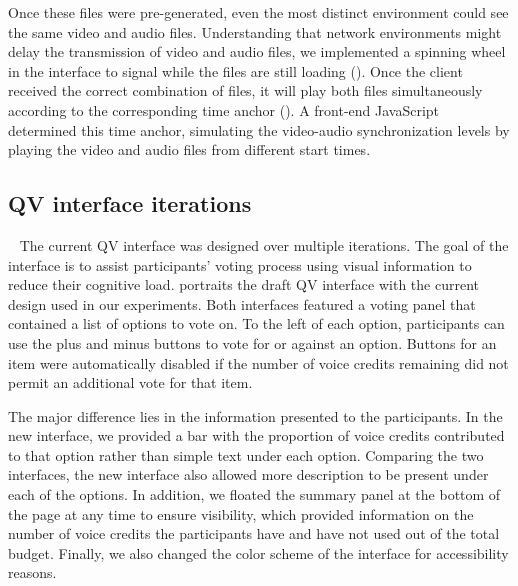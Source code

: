 Once these files were pre-generated, even the most distinct environment could see the same video and audio files. Understanding that network environments might delay the transmission of video and audio files, we implemented a spinning wheel in the interface to signal while the files are still loading (). Once the client received the correct combination of files, it will play both files simultaneously according to the corresponding time anchor (). A front-end JavaScript determined this time anchor, simulating the video-audio synchronization levels by playing the video and audio files from different start times. 

\subsection{QV interface iterations}~\label{appx_qv_interface}
The current QV interface was designed over multiple iterations. The goal of the interface is to assist participants' voting process using visual information to reduce their cognitive load.  portraits the draft QV interface with the current design used in our experiments. Both interfaces featured a voting panel that contained a list of options to vote on. To the left of each option, participants can use the plus and minus buttons to vote for or against an option. Buttons for an item were automatically disabled if the number of voice credits remaining did not permit an additional vote for that item. 

The major difference lies in the information presented to the participants. In the new interface, we provided a bar with the proportion of voice credits contributed to that option rather than simple text under each option. Comparing the two interfaces, the new interface also allowed more description to be present under each of the options. In addition, we floated the summary panel at the bottom of the page at any time to ensure visibility, which provided information on the number of voice credits the participants have and have not used out of the total budget. Finally, we also changed the color scheme of the interface for accessibility reasons.


